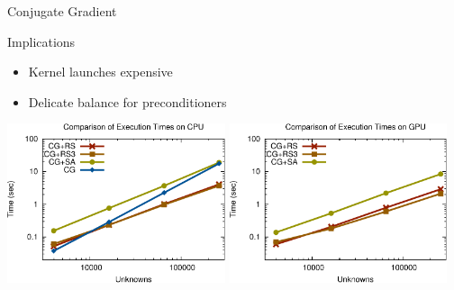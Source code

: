 \begin{frame}[fragile]{Conjugate Gradient}

 \begin{block}{Implications}
   \begin{itemize}
   \item Kernel launches expensive
   \item Delicate balance for preconditioners
  \end{itemize}
  
    \vspace*{.8cm}
  \begin{center}
   \includegraphics[width=0.48\textwidth]{figures/cpu_scaling-2} \hfill
   \includegraphics[width=0.48\textwidth]{figures/gpu_scaling-1}
  \end{center}
    \vspace*{.8cm}  
 \end{block}
   
\end{frame}

